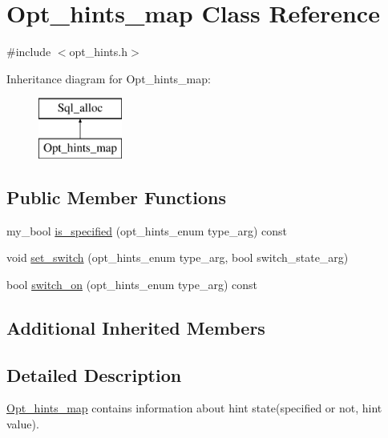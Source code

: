 \hypertarget{classOpt__hints__map}{}\section{Opt\+\_\+hints\+\_\+map Class Reference}
\label{classOpt__hints__map}


{\ttfamily \#include $<$opt\+\_\+hints.\+h$>$}

Inheritance diagram for Opt\+\_\+hints\+\_\+map\+:\begin{figure}[H]
\begin{center}
\leavevmode
\includegraphics[height=2.000000cm]{classOpt__hints__map}
\end{center}
\end{figure}
\subsection*{Public Member Functions}
\begin{DoxyCompactItemize}
\item 
my\+\_\+bool \mbox{\hyperlink{classOpt__hints__map_a48d7456abac078864a2edc3c55e0bdbf}{is\+\_\+specified}} (opt\+\_\+hints\+\_\+enum type\+\_\+arg) const
\item 
void \mbox{\hyperlink{classOpt__hints__map_a5fd4fb3a278d54ce94545ceac008f0f7}{set\+\_\+switch}} (opt\+\_\+hints\+\_\+enum type\+\_\+arg, bool switch\+\_\+state\+\_\+arg)
\item 
bool \mbox{\hyperlink{classOpt__hints__map_a00cda3527fd59086e361e0bd4f6f07c4}{switch\+\_\+on}} (opt\+\_\+hints\+\_\+enum type\+\_\+arg) const
\end{DoxyCompactItemize}
\subsection*{Additional Inherited Members}


\subsection{Detailed Description}
\mbox{\hyperlink{classOpt__hints__map}{Opt\+\_\+hints\+\_\+map}} contains information about hint state(specified or not, hint value). 


